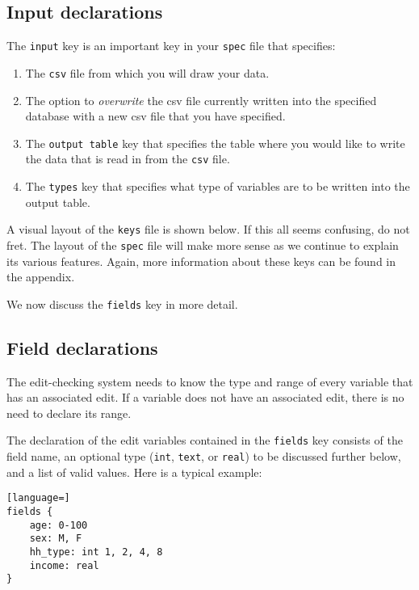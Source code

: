 \documentclass{article}
\begin{document}
\subsection{Input declarations}
The {\tt input} key is an important key in your {\tt spec} file that specifies:
\begin{enumerate}
\item The {\tt csv} file from which you will draw your data.
\item The option to \textit{overwrite} the csv file currently written into the specified database with 
a new csv file that you have specified.
\item The {\tt output table} key that specifies the table where you would like to 
write the data that is read in from the {\tt csv} file.
\item The {\tt types} key that specifies what type of variables are to be written 
into the output table.
\end{enumerate}

A visual layout of the {\tt keys} file is shown below. If this all seems confusing, do not fret. The layout of the {\tt spec} file will make more sense as we continue to explain its various features. Again, 
  more information about these keys can be found in the appendix.\\

{

    
}

We now discuss the {\tt fields} key in more detail.


\subsection{Field declarations} The edit-checking system needs to know the type and range
of every variable that has an associated edit. If a variable does not have an associated
edit, there is no need to declare its range.

The declaration of the edit variables contained in the {\tt fields} key consists of the field name, 
an optional type ({\tt int}, {\tt text}, or 
{\tt real}) to be discussed further below, and a list of valid values. Here is a typical example:

\begin{lstlisting}[language=]
fields {
    age: 0-100
    sex: M, F
    hh_type: int 1, 2, 4, 8
    income: real
}
\end{lstlisting}
\end{document}
